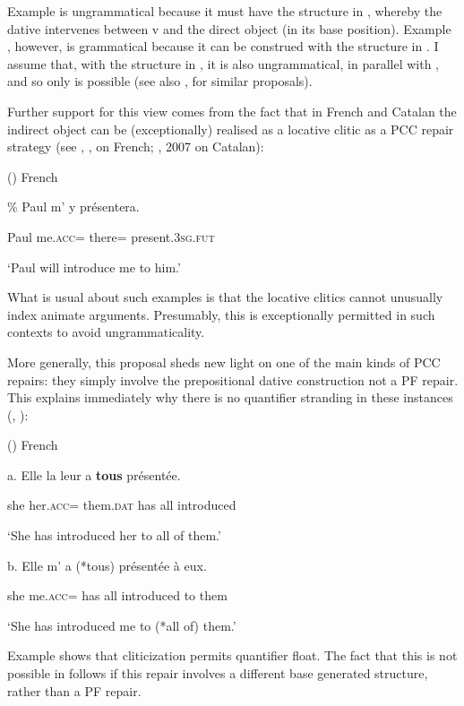 \documentclass[output=paper,modfonts,nonflat]{langsci/langscibook}
\begin{document}
Example  is ungrammatical because it must have the structure in , whereby the dative intervenes between v and the direct object (in its base position). Example , however, is grammatical because it can be construed with the structure in . I assume that, with the structure in , it is also ungrammatical, in parallel with , and so only  is possible (see also \citealt{Anagnostopoulou2003}, \citealt{Rezac2008} for similar proposals). 

Further support for this view comes from the fact that in French and Catalan the indirect object can be (exceptionally) realised as a locative clitic as a PCC repair strategy (see \citealt{Postal1990}, \citealt{Rezac2008}, on French; \citealt{Bonet1991}, 2007 on Catalan):

()  French

  \%  Paul   m’       y       présentera.

    Paul   me.\textsc{acc}=   there\textsc{=}   present.\textsc{3sg.fut}

  ‘Paul will introduce me to him.’

What is usual about such examples is that the locative clitics cannot unusually index animate arguments. Presumably, this is exceptionally permitted in such contexts to avoid ungrammaticality.

More generally, this proposal sheds new light on one of the main kinds of PCC repairs: they simply involve the prepositional dative construction not a PF repair. This explains immediately why there is no quantifier stranding in these instances (\citealt{Kayne1975}, \citealt{Rezac2008}):

()  French \citep[98]{Rezac2008}

  a.   Elle   la   leur   a   \textbf{tous}   présentée.

    she   her.\textsc{acc}=  them.\textsc{dat}   has   all   introduced 

  ‘She has introduced her to all of them.’ 

b.   Elle m'   a   (*tous)   présentée     à   eux. 

  she me.\textsc{acc}= has   all     introduced  to   them 

    ‘She has introduced me to (*all of) them.’~

Example  shows that cliticization permits quantifier float. The fact that this is not possible in  follows if this repair involves a different base generated structure, rather than a PF repair. 
\end{document}
